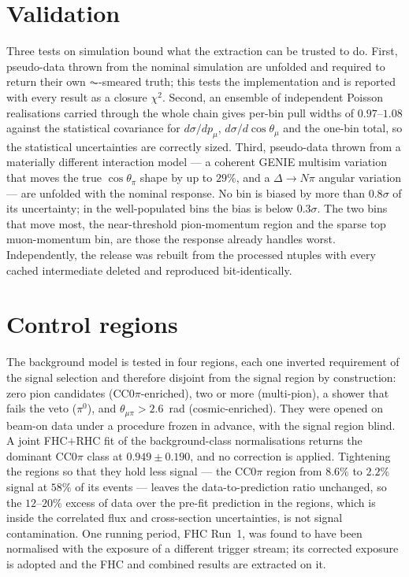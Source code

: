 \documentclass[aps,prd,twocolumn,superscriptaddress,nofootinbib,floatfix]{revtex4-2}
\begin{document}
\section{Validation}
\label{sec:validation}

Three tests on simulation bound what the extraction can be trusted to do. First, pseudo-data
thrown from the nominal simulation are unfolded and required to return their own $\AC$-smeared
truth; this tests the implementation and is reported with every result as a closure $\chi^2$.
Second, an ensemble of independent Poisson realisations carried through the whole chain gives
per-bin pull widths of $0.97$--$1.08$ against the statistical covariance for $d\sigma/dp_\mu$,
$d\sigma/d\cos\theta_\mu$ and the one-bin total, so the statistical uncertainties are correctly
sized. Third, pseudo-data thrown from a materially different interaction model --- a coherent
GENIE multisim variation that moves the true $\cos\theta_\pi$ shape by up to $29\%$, and a
$\Delta\to N\pi$ angular variation --- are unfolded with the nominal response. No bin is biased by
more than $0.8\sigma$ of its uncertainty; in the well-populated bins the bias is below $0.3\sigma$.
The two bins that move most, the near-threshold pion-momentum region and the sparse top
muon-momentum bin, are those the response already handles worst. Independently, the release was
rebuilt from the processed ntuples with every cached intermediate deleted and reproduced
bit-identically.

\section{Control regions}
\label{sec:cr}

The background model is tested in four regions, each one inverted requirement of the signal
selection and therefore disjoint from the signal region by construction: zero pion candidates
(CC$0\pi$-enriched), two or more (multi-pion), a shower that fails the veto ($\pi^0$), and
$\theta_{\mu\pi}>2.6$~rad (cosmic-enriched). They were opened on beam-on data under a procedure
frozen in advance, with the signal region blind. A joint FHC$+$RHC fit of the background-class
normalisations returns the dominant CC$0\pi$ class at $0.949\pm0.190$, and no correction is
applied. Tightening the regions so that they hold less signal --- the CC$0\pi$ region from $8.6\%$
to $2.2\%$ signal at $58\%$ of its events --- leaves the data-to-prediction ratio unchanged, so the
$12$--$20\%$ excess of data over the pre-fit prediction in the regions, which is inside the correlated
flux and cross-section uncertainties, is not signal contamination. One running
period, FHC Run~1, was found to have been normalised with the exposure of a different trigger
stream; its corrected exposure is adopted and the FHC and combined results are extracted on it.
\end{document}
